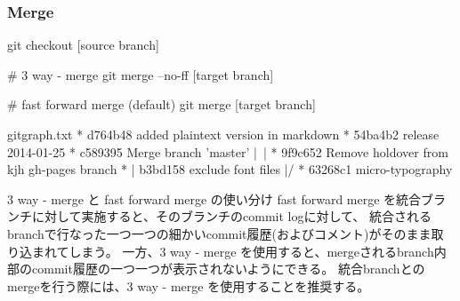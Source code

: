 \documentclass[10pt,a4j,openany,dvipdfmx]{jsarticle}
\begin{document}
\subsubsection{Merge} %
\label{ssub:merge}

\begin{commandshell}
git checkout [source branch]

# 3 way - merge
git merge --no-ff [target branch]

# fast forward merge (default)
git merge [target branch]
\end{commandshell}


\begin{filecontents}{gitgraph.txt}
* d764b48 added plaintext version in markdown
* 54ba4b2 release 2014-01-25
*   c589395 Merge branch 'master'
|\
| * 9f9c652 Remove holdover from kjh gh-pages branch
* | b3bd158 exclude font files
|/
* 63268c1 micro-typography
\end{filecontents}



\begin{oceanbox}{3 way - merge と fast forward merge の使い分け}
fast forward merge を統合ブランチに対して実施すると、そのブランチのcommit logに対して、
統合されるbranchで行なった一つ一つの細かいcommit履歴(およびコメント)がそのまま取り込まれてしまう。
一方、3 way - merge を使用すると、mergeされるbranch内部のcommit履歴の一つ一つが表示されないようにできる。
\tcblower
統合branchとのmergeを行う際には、3 way - merge を使用することを推奨する。
\end{oceanbox}
\end{document}
